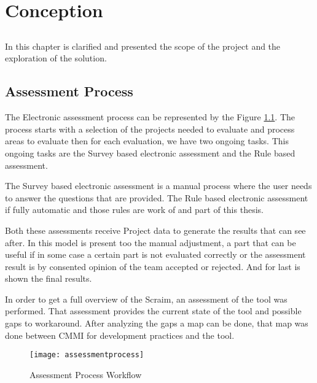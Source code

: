 \chapter{Conception} \label{chap:conception}

\section*{}

In this chapter is clarified and presented the scope of the project and the exploration of the solution.

\section{Assessment Process} \label{sec:Approach}

The Electronic assessment process can be represented by the Figure \ref{fig:assessmentprocess}.
The process starts with a selection of the projects needed to evaluate and process areas to evaluate then for each evaluation, we have two ongoing tasks. This ongoing tasks are the Survey based electronic assessment and the Rule based assessment.

The Survey based electronic assessment is a manual process where the user needs to answer the questions that are provided. The Rule based electronic assessment if fully automatic and those rules are work of and part of this thesis.

Both these assessments receive Project data to generate the results that can see after. In this model is present too the manual adjustment, a part that can be useful if in some case a certain part is not evaluated correctly or the assessment result is by consented opinion of the team accepted or rejected. And for last is shown the final results. 


In order to get a full overview of the Scraim, an assessment of the tool was performed. That assessment provides the current state of the tool and possible gaps to workaround.
After analyzing the gaps a map can be done, that map was done between CMMI for development practices and the tool.

\begin{landscape}
	\begin{figure}[h]
		\begin{center}
			\leavevmode
			\texttt{[image: assessmentprocess]}
			\caption{Assessment Process Workflow}
			\label{fig:assessmentprocess}
		\end{center}
	\end{figure}
\end{landscape}

